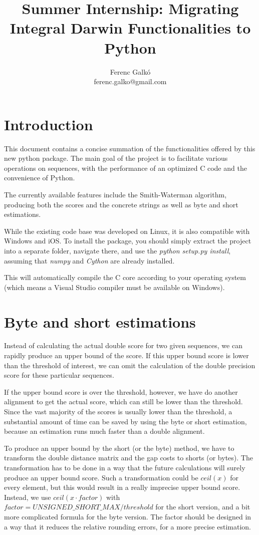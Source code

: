 \documentclass[12pt]{article}
\title{Summer Internship: Migrating Integral Darwin Functionalities to Python}
\author{Ferenc Galk\'o  \\
    ferenc.galko@gmail.com}
\begin{document}
\maketitle
\newpage
\tableofcontents
\newpage
\section{Introduction}
This document contains a concise summation of the functionalities offered by this new python package. The main goal of the project is to facilitate various operations on sequences, with the performance of an optimized C code and the convenience of Python.

The currently available features include the Smith-Waterman algorithm, producing both the scores and the concrete strings as well as byte and short estimations. 

While the existing code base was developed on Linux, it is also compatible with Windows and iOS. To install the package, you should simply extract the project into a separate folder, navigate there, and use the \emph{python setup.py install}, assuming that \emph{numpy} and \emph{Cython} are already installed. 

This will automatically compile the  C core according to your operating system (which means a Visual Studio compiler must be available on Windows). 
\section{Byte and short estimations}
Instead of calculating the actual double score for two given sequences, we can rapidly produce an upper bound of the score. If this upper bound score is lower than the threshold of interest, we can omit the calculation of the double precision score for these particular sequences.

If the upper bound score is over the threshold, however, we have do another alignment to get the actual
 score, which can still be lower than the threshold. Since the vast majority of the scores is usually lower than the threshold, a substantial amount of time can be saved by using the byte or short estimation, because an estimation runs much faster than a double alignment.

To produce an upper bound by the short (or the byte) method, we have to transform the double distance matrix and the gap costs to shorts (or bytes). The transformation has to be done in a way that the future calculations will surely produce an upper bound score. Such a transformation could be $ceil(x)$ for every element, but this would result in a really imprecise upper bound score. Instead, we use $ceil(x \cdot factor)$ with $factor=UNSIGNED\_SHORT\_MAX / threshold$ for the short version, and a bit more complicated formula for the byte version. The factor should be designed in a way that it reduces the relative rounding errors, for a more precise estimation.
\end{document}
